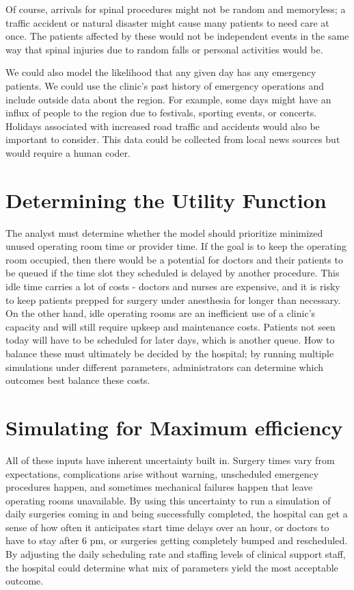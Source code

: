 \documentclass[]{article}
\begin{document}
\begin{large}
Of course, arrivals for spinal procedures might not be random and memoryless; a traffic accident or natural disaster might cause many patients to need care at once. The patients affected by these would not be independent events in the same way that spinal injuries due to random falls or personal activities would be.

We could also model the likelihood that any given day has any emergency patients. We could use the clinic's past history of emergency operations and include outside data about the region. For example, some days might have an influx of people to the region due to festivals, sporting events, or concerts. Holidays associated with increased road traffic and accidents would also be important to consider. This data could be collected from local news sources but would require a human coder.

\section{Determining the Utility Function}

The analyst must determine whether the model should prioritize minimized unused operating room time or provider time. If the goal is to keep the operating room occupied, then there would be a potential for doctors and their patients to be queued if the time slot they scheduled is delayed by another procedure. This idle time carries a lot of costs - doctors and nurses are expensive, and it is risky to keep patients prepped for surgery under anesthesia for longer than necessary. On the other hand, idle operating rooms are an inefficient use of a clinic's capacity and will still require upkeep and maintenance costs. Patients not seen today will have to be scheduled for later days, which is another queue. How to balance these must ultimately be decided by the hospital; by running multiple simulations under different parameters, administrators can determine which outcomes best balance these costs.

\section{Simulating for Maximum efficiency}

All of these inputs have inherent uncertainty built in. Surgery times vary from expectations, complications arise without warning, unscheduled emergency procedures happen, and sometimes mechanical failures happen that leave operating rooms unavailable. By using this uncertainty to run a simulation of daily surgeries coming in and being successfully completed, the hospital can get a sense of how often it anticipates start time delays over an hour, or doctors to have to stay after 6 pm, or surgeries getting completely bumped and rescheduled. By adjusting the daily scheduling rate and staffing levels of clinical support staff, the hospital could determine what mix of parameters yield the most acceptable outcome.


\end{large}
\end{document}
